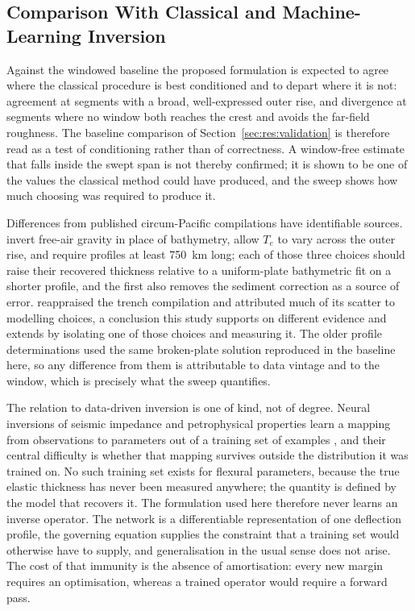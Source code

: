 \documentclass[final]{agujournal2019}
\begin{document}
\subsection{Comparison With Classical and Machine-Learning Inversion}\label{sec:disc:comparison}

Against the windowed baseline the proposed formulation is expected to agree
where the classical procedure is best conditioned and to depart where it is
not: agreement at segments with a broad, well-expressed outer rise, and
divergence at segments where no window both reaches the crest and avoids the
far-field roughness. The baseline comparison of
Section~\ref{sec:res:validation} is therefore read as a test of conditioning
rather than of correctness. A window-free estimate that falls inside the swept
span is not thereby confirmed;
it is shown to be one of the values the classical method could have produced,
and the sweep shows how much choosing was required to produce it.

Differences from published circum-Pacific compilations have
identifiable sources.  invert free-air gravity in place
of bathymetry, allow $T_{e}$ to vary across the outer rise, and
require profiles at least 750~km long; each of those three choices should raise
their recovered thickness relative to a uniform-plate bathymetric fit on a
shorter profile, and the first also removes the sediment correction as a source
of error.  reappraised the trench compilation and attributed
much of its scatter to modelling choices, a conclusion this study supports on
different evidence and extends by isolating one of those choices and measuring
it. The older profile determinations
\cite{Caldwell1976,BodineWatts1979,Tandon2000} used the same broken-plate
solution reproduced in the baseline here, so any difference from them is
attributable to data vintage and to the window, which is precisely what the
sweep quantifies.

The relation to data-driven inversion is one of kind, not of degree. Neural
inversions of seismic impedance and petrophysical properties learn a mapping
from observations to parameters out of a training set of examples
\cite{Das2019,ChenSchuster2020,Zhao2024}, and their central difficulty is
whether that mapping survives outside the distribution it was trained on. No
such training set exists for flexural parameters, because the true elastic
thickness has never been measured anywhere; the quantity is defined by the model
that recovers it. The formulation used here therefore never learns an inverse
operator. The network is a differentiable representation of one deflection
profile, the governing equation supplies the constraint that a training set
would otherwise have to supply, and generalisation in the usual sense does not
arise. The cost of that immunity is the absence of amortisation: every new
margin requires an optimisation, whereas a trained operator would require a
forward pass.
\end{document}
